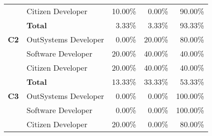 \begin{table}[tb]
\begin{tabular}{llrrr}
                            & Citizen Developer    & 10.00\%                                                           & 0.00\%                                                                  & 90.00\%                                                       \\
                            & \textbf{Total}       & 3.33\%                                                            & 3.33\%                                                                  & 93.33\%                                                       \\ \hline
  \textbf{C2}               & OutSystems Developer & 0.00\%                                                            & 20.00\%                                                                 & 80.00\%                                                       \\
                            & Software Developer   & 20.00\%                                                           & 40.00\%                                                                 & 40.00\%                                                       \\
                            & Citizen Developer    & 20.00\%                                                           & 40.00\%                                                                 & 40.00\%                                                       \\
                            & \textbf{Total}       & 13.33\%                                                           & 33.33\%                                                                 & 53.33\%                                                       \\ \hline
  \textbf{C3}               & OutSystems Developer & 0.00\%                                                            & 0.00\%                                                                  & 100.00\%                                                      \\
                            & Software Developer   & 0.00\%                                                            & 0.00\%                                                                  & 100.00\%                                                      \\
                            & Citizen Developer    & 20.00\%                                                           & 0.00\%                                                                  & 80.00\%                                                       \\

\end{tabular}
\end{table}
